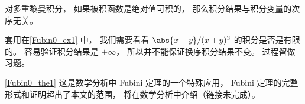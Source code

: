 \begin{theorem}{}\label{Fubin0_the1}
对多重黎曼积分， 如果被积函数是绝对值可积的， 那么积分结果与积分变量的次序无关。
\end{theorem}

套用在\autoref{Fubin0_ex1} 中， 我们需要看看 $\abs{x-y}/(x+y)^3$ 的积分是否是有限的。 容易验证积分结果是 $+\infty$， 所以并不能保证换序积分结果不变。 过程留做习题。

\autoref{Fubin0_the1} 这是数学分析中 Fubini 定理的一个特殊应用， Fubini 定理的完整形式和证明超出了本文的范围， 将在数学分析中介绍（链接未完成）。
